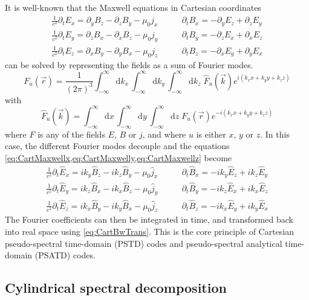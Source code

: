\documentclass[a4paper]{article}   	%
\newcommand{\Integ}[1]{\int_{-\infty}^{\infty} \!\!\!\!\!
  \mathrm{d}#1}
\begin{document}
It is well-known that the Maxwell equations in Cartesian coordinates 
\begin{align}
\frac{1}{c^2}\partial_t E_x = \partial_y B_z - \partial_z B_y - \mu_0  j_x \qquad&   
\partial_t B_x = -\partial_y E_z + \partial_z E_y \label{eq:CartMaxwellx} \\
\frac{1}{c^2}\partial_t E_y = \partial_z B_x - \partial_x B_z - \mu_0  j_y \qquad &   
\partial_t B_y = -\partial_z E_x + \partial_x E_z \label{eq:CartMaxwelly}  \\
\frac{1}{c^2}\partial_t E_z = \partial_x B_y - \partial_y B_x - \mu_0  j_z \qquad &   
\partial_t B_z = -\partial_x E_y + \partial_y E_x \label{eq:CartMaxwellz} 
\end{align}
can be solved by representing the fields as a sum of Fourier modes.
\begin{equation}
\label{eq:CartBwTrans}
F_u(\vec{r}) = \frac{1}{(2\pi)^{3}}\Integ{k_x} \,\Integ{k_y}\, \Integ{k_z} \; \hat{F}_u(\vec{k}) e^{i(k_x x + k_y y + k_z z)} 
\end{equation}
with 
\begin{equation}
\label{eq:CartFwTrans}
\hat{F}_u(\vec{k})  = \Integ{x} \,\Integ{y}\, \Integ{z} \; F_u(\vec{r}) e^{-i(k_x x + k_y y + k_z z)} 
\end{equation}
where $F$ is any of the fields $E$, $B$ or $j$, and where $u$ is
either $x$, $y$ or $z$. In this case, the different Fourier modes decouple and the equations \cref{eq:CartMaxwellx,eq:CartMaxwelly,eq:CartMaxwellz} become 
\begin{align}
\frac{1}{c^2}\partial_t \hat{E}_x = ik_y \hat{B}_z - ik_z \hat{B}_y - \mu_0 \hat{j}_x \qquad &   
\partial_t \hat{B}_x = -ik_y \hat{E}_z + ik_z \hat{E}_y \\
\frac{1}{c^2}\partial_t \hat{E}_y = ik_z \hat{B}_x - ik_x \hat{B}_z - \mu_0  \hat{j}_y \qquad &   
\partial_t \hat{B}_y = -ik_z \hat{E}_x + ik_x \hat{E}_z \\
\frac{1}{c^2}\partial_t \hat{E}_z = ik_x \hat{B}_y - ik_y \hat{B}_x - \mu_0 \hat{j}_z  \qquad &   
\partial_t \hat{B}_z = -ik_x \hat{E}_y + ik_y \hat{E}_x 
\end{align}
The Fourier coefficients can then be integrated in time, and
transformed back into real space using \cref{eq:CartBwTrans}. This is
the core principle of Cartesian pseudo-spectral time-domain (PSTD)
codes and pseudo-spectral analytical time-domain (PSATD) codes.

\subsection{Cylindrical spectral decomposition}
\end{document}
